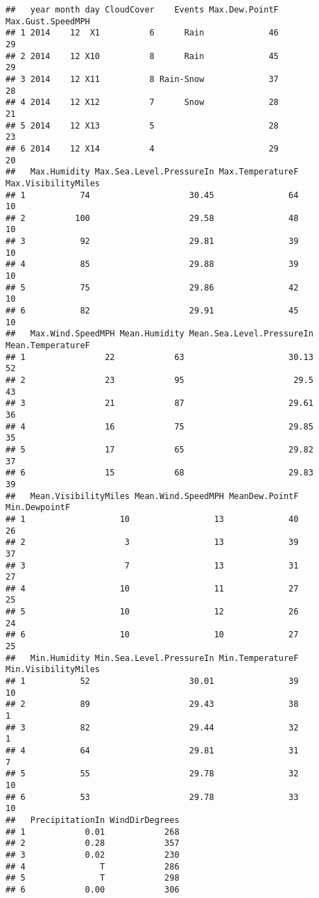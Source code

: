 \documentclass[
]{article}
\begin{document}
\begin{verbatim}
##   year month day CloudCover    Events Max.Dew.PointF Max.Gust.SpeedMPH
## 1 2014    12  X1          6      Rain             46                29
## 2 2014    12 X10          8      Rain             45                29
## 3 2014    12 X11          8 Rain-Snow             37                28
## 4 2014    12 X12          7      Snow             28                21
## 5 2014    12 X13          5                       28                23
## 6 2014    12 X14          4                       29                20
##   Max.Humidity Max.Sea.Level.PressureIn Max.TemperatureF Max.VisibilityMiles
## 1           74                    30.45               64                  10
## 2          100                    29.58               48                  10
## 3           92                    29.81               39                  10
## 4           85                    29.88               39                  10
## 5           75                    29.86               42                  10
## 6           82                    29.91               45                  10
##   Max.Wind.SpeedMPH Mean.Humidity Mean.Sea.Level.PressureIn Mean.TemperatureF
## 1                22            63                     30.13                52
## 2                23            95                      29.5                43
## 3                21            87                     29.61                36
## 4                16            75                     29.85                35
## 5                17            65                     29.82                37
## 6                15            68                     29.83                39
##   Mean.VisibilityMiles Mean.Wind.SpeedMPH MeanDew.PointF Min.DewpointF
## 1                   10                 13             40            26
## 2                    3                 13             39            37
## 3                    7                 13             31            27
## 4                   10                 11             27            25
## 5                   10                 12             26            24
## 6                   10                 10             27            25
##   Min.Humidity Min.Sea.Level.PressureIn Min.TemperatureF Min.VisibilityMiles
## 1           52                    30.01               39                  10
## 2           89                    29.43               38                   1
## 3           82                    29.44               32                   1
## 4           64                    29.81               31                   7
## 5           55                    29.78               32                  10
## 6           53                    29.78               33                  10
##   PrecipitationIn WindDirDegrees
## 1            0.01            268
## 2            0.28            357
## 3            0.02            230
## 4               T            286
## 5               T            298
## 6            0.00            306
\end{verbatim}
\end{document}
